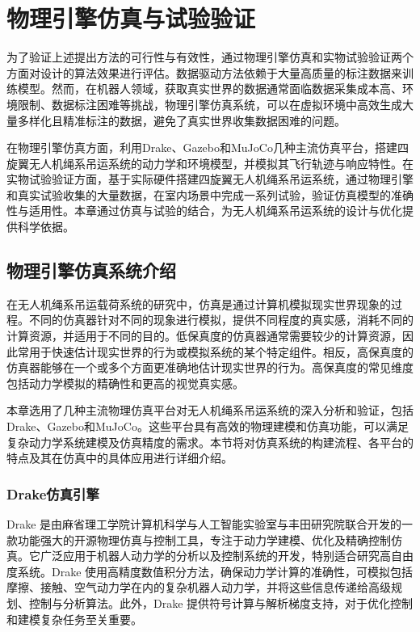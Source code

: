 \documentclass[lang=chs, degree=master, blindreview=true, winfonts=true]{yanputhesis}
\begin{document}
\chapter{物理引擎仿真与试验验证}
为了验证上述提出方法的可行性与有效性，通过物理引擎仿真和实物试验验证两个方面对设计的算法效果进行评估。数据驱动方法依赖于大量高质量的标注数据来训练模型。然而，在机器人领域，获取真实世界的数据通常面临数据采集成本高、环境限制、数据标注困难等挑战，物理引擎仿真系统，可以在虚拟环境中高效生成大量多样化且精准标注的数据，避免了真实世界收集数据困难的问题。

在物理引擎仿真方面，利用Drake、Gazebo和MuJoCo几种主流仿真平台，搭建四旋翼无人机绳系吊运系统的动力学和环境模型，并模拟其飞行轨迹与响应特性。在实物试验验证方面，基于实际硬件搭建四旋翼无人机绳系吊运系统，通过物理引擎和真实试验收集的大量数据，在室内场景中完成一系列试验，验证仿真模型的准确性与适用性。本章通过仿真与试验的结合，为无人机绳系吊运系统的设计与优化提供科学依据。
\section{物理引擎仿真系统介绍}
在无人机绳系吊运载荷系统的研究中，仿真是通过计算机模拟现实世界现象的过程。不同的仿真器针对不同的现象进行模拟，提供不同程度的真实感，消耗不同的计算资源，并适用于不同的目的。低保真度的仿真器通常需要较少的计算资源，因此常用于快速估计现实世界的行为或模拟系统的某个特定组件。相反，高保真度的仿真器能够在一个或多个方面更准确地估计现实世界的行为。高保真度的常见维度包括动力学模拟的精确性和更高的视觉真实感。

本章选用了几种主流物理仿真平台对无人机绳系吊运系统的深入分析和验证，包括Drake、Gazebo和MuJoCo。这些平台具有高效的物理建模和仿真功能，可以满足复杂动力学系统建模及仿真精度的需求。本节将对仿真系统的构建流程、各平台的特点及其在仿真中的具体应用进行详细介绍。



\subsection{Drake仿真引擎}

Drake 是由麻省理工学院计算机科学与人工智能实验室与丰田研究院联合开发的一款功能强大的开源物理仿真与控制工具，专注于动力学建模、优化及精确控制仿真。它广泛应用于机器人动力学的分析以及控制系统的开发，特别适合研究高自由度系统。Drake 使用高精度数值积分方法，确保动力学计算的准确性，可模拟包括摩擦、接触、空气动力学在内的复杂机器人动力学，并将这些信息传递给高级规划、控制与分析算法。此外，Drake 提供符号计算与解析梯度支持，对于优化控制和建模复杂任务至关重要。
\end{document}
